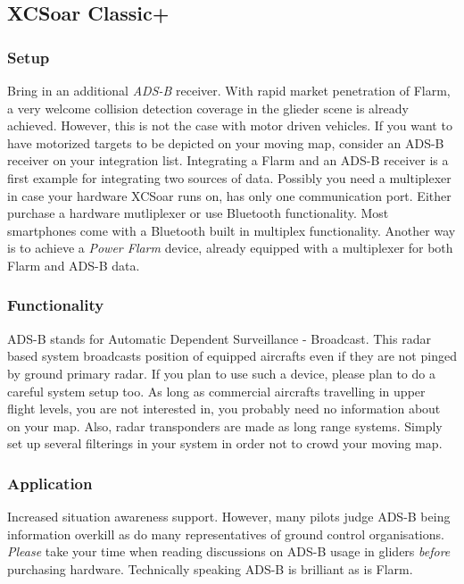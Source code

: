 \subsection*{XCSoar Classic+}
\subsubsection*{Setup} Bring in an additional \emph{ADS-B} receiver. With rapid 
market penetration of Flarm, a very welcome collision detection coverage in the 
glieder scene is already achieved. However, this is not the case with motor 
driven vehicles. If you want to have motorized targets to be depicted on your 
moving map, consider an ADS-B receiver on your integration list. Integrating a 
Flarm and an ADS-B receiver is a first example for integrating two sources of 
data. Possibly you need a multiplexer in case your hardware XCSoar runs on, has 
only one communication port. Either purchase a hardware mutliplexer or use 
Bluetooth functionality. Most smartphones come with a Bluetooth built in 
multiplex functionality. Another way is to achieve a \emph{Power Flarm} device, 
already equipped with a multiplexer for both Flarm and ADS-B data. 

\subsubsection*{Functionality} ADS-B stands for Automatic Dependent Surveillance 
- Broadcast. 
This radar based system broadcasts position of equipped aircrafts even if they 
are not pinged by ground primary radar. If you plan to use such a device, 
please plan to do a careful system setup too. As long as commercial aircrafts 
travelling in upper flight levels, you are not interested in, you probably need
no information about on your map. Also, radar transponders are made as long 
range systems. Simply set up several filterings in your system in order not to 
crowd your moving map.

\subsubsection*{Application} Increased situation awareness support. However, many 
pilots judge ADS-B being information overkill as do many representatives of 
ground control organisations. \emph{Please} take your time when reading 
discussions on ADS-B usage in gliders \emph{before} purchasing hardware. 
Technically speaking ADS-B is brilliant as is Flarm.

